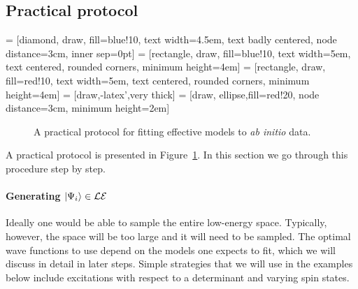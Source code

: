 \documentclass[aps, prb, 11pt]{revtex4-1}
\begin{document}
\subsection{Practical protocol}

 = [diamond, draw, fill=blue!10, 
    text width=4.5em, text badly centered, node distance=3cm, inner sep=0pt]
 = [rectangle, draw, fill=blue!10, 
    text width=5em, text centered, rounded corners, minimum height=4em]
 = [rectangle, draw, fill=red!10, 
    text width=5em, text centered, rounded corners, minimum height=4em]
 = [draw,-latex',very thick]
 = [draw, ellipse,fill=red!20, node distance=3cm,
    minimum height=2em]
\begin{figure}[hbt]
\caption{A practical protocol for fitting effective models to {\it ab initio} data.}
\label{fig:protocol} 
\end{figure}

A practical protocol is presented in Figure~\ref{fig:protocol}. 
In this section we go through this procedure step by step.

\paragraph{Generating $\ket{\Psi_i}\in \mathcal{LE}$}
Ideally one would be able to sample the entire low-energy space. 
Typically, however, the space will be too large and it will need to be sampled. 
The optimal wave functions to use depend on the models one expects to fit, which we will discuss in detail  in later steps. 
Simple strategies that we will use in the examples below include excitations with respect to a determinant and varying spin states.
\end{document}
